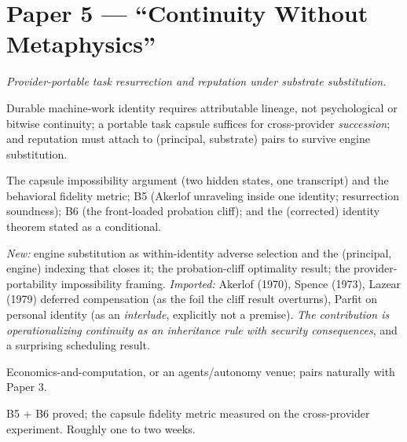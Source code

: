 \documentclass[11pt,a4paper]{article}
\begin{document}
\section{Paper 5 --- ``Continuity Without Metaphysics''}
\emph{Provider-portable task resurrection and reputation under substrate substitution.}
\begin{description}[leftmargin=0em,style=unboxed]
\item[Thesis.] Durable machine-work identity requires attributable lineage, not psychological or bitwise continuity; a portable task capsule suffices for cross-provider \emph{succession}; and reputation must attach to (principal, substrate) pairs to survive engine substitution.
\item[Results.] The capsule impossibility argument (two hidden states, one transcript) and the behavioral fidelity metric; B5 (Akerlof unraveling inside one identity; resurrection soundness); B6 (the front-loaded probation cliff); and the (corrected) identity theorem stated as a conditional.
\item[Novelty, honestly.] \emph{New:} engine substitution as within-identity adverse selection and the (principal, engine) indexing that closes it; the probation-cliff optimality result; the provider-portability impossibility framing. \emph{Imported:} Akerlof (1970), Spence (1973), Lazear (1979) deferred compensation (as the foil the cliff result overturns), Parfit on personal identity (as an \emph{interlude}, explicitly not a premise). \emph{The contribution is operationalizing continuity as an inheritance rule with security consequences}, and a surprising scheduling result.
\item[Venue.] Economics-and-computation, or an agents/autonomy venue; pairs naturally with Paper 3.
\item[Gate.] B5 + B6 proved; the capsule fidelity metric measured on the cross-provider experiment. Roughly one to two weeks.
\end{description}
\end{document}
